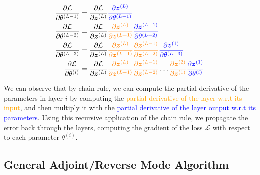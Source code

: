 \begin{align*}
    \frac{\partial \mathcal{L}}{\partial \theta^{(L-1)}} & = \frac{\partial \mathcal{L}}{\partial \bm{z}^{(L)}} \textcolor{blue}{\frac{\partial \bm{z}^{(L)}}{\partial \theta^{(L-1)}}}                                                                                                                                                                                                                \\
    \frac{\partial \mathcal{L}}{\partial \theta^{(L-2)}} & = \frac{\partial \mathcal{L}}{\partial \bm{z}^{(L)}} \textcolor{orange}{\frac{\partial \bm{z}^{(L)}}{\partial \bm{z}^{(L-1)}}} \textcolor{blue}{\frac{\partial \bm{z}^{(L-1)}}{\partial \theta^{(L-2)}}}                                                                                                                                    \\
    \frac{\partial \mathcal{L}}{\partial \theta^{(L-3)}} & = \frac{\partial \mathcal{L}}{\partial \bm{z}^{(L)}} \textcolor{orange}{\frac{\partial \bm{z}^{(L)}}{\partial \bm{z}^{(L-1)}} \frac{\partial \bm{z}^{(L-1)}}{\partial \bm{z}^{(L-2)}} } \textcolor{blue}{\frac{\partial \bm{z}^{(1)}}{\partial \theta^{(L-3)}}}                                                                             \\
    \frac{\partial \mathcal{L}}{\partial \theta^{(i)}}   & = \frac{\partial \mathcal{L}}{\partial \bm{z}^{(L)}} \textcolor{orange}{\frac{\partial \bm{z}^{(L)}}{\partial \bm{z}^{(L-1)}} \frac{\partial \bm{z}^{(L-1)}}{\partial \bm{z}^{(L-2)}} } \dots \textcolor{orange}{\frac{\partial \bm{z}^{(2)}}{\partial \bm{z}^{(1)}}} \textcolor{blue}{\frac{\partial \bm{z}^{(1)}}{\partial \theta^{(i)}}}
\end{align*}

We can observe that by chain rule, we can compute the partial derivative of the parameters in layer $i$ by computing the \textcolor{orange}{partial derivative of the layer w.r.t its input}, and then multiply it with the \textcolor{blue}{partial derivative of the layer output w.r.t its parameters}. Using this recursive application of the chain rule, we propagate the error back through the layers, computing the gradient of the loss \( \mathcal{L} \) with respect to each parameter \( \theta^{(i)} \).

\newpage
\subsection{General Adjoint/Reverse Mode Algorithm}

